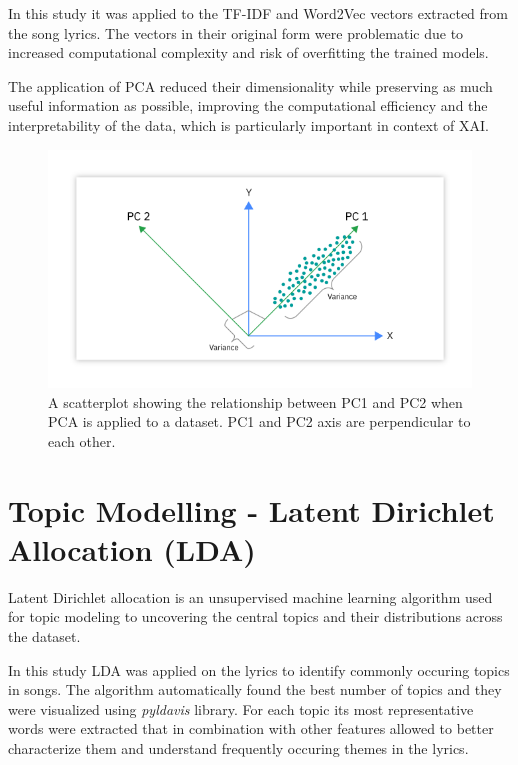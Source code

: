 In this study it was applied to the TF-IDF and Word2Vec vectors extracted from
the song lyrics. The vectors in their original form were problematic due  to
increased computational complexity and risk of overfitting the trained models.

The application of PCA reduced their dimensionality while preserving as much
useful information as possible, improving the computational efficiency and 
the interpretability of the data, which is particularly important in context of
XAI.

\begin{center}
\begin{figure}[H]
  \centering
  \includegraphics[width=6in]{img/pca.png}
  \caption{A scatterplot showing the relationship between PC1 and PC2 when PCA
  is applied to a dataset. PC1 and PC2 axis are perpendicular to each other. \cite{pca}}
  \label{Figure:pca}
\end{figure}
\end{center}


\section{Topic Modelling - Latent Dirichlet Allocation (LDA)}
\label{sec:topicmodelling}

Latent Dirichlet allocation is an unsupervised machine learning algorithm used
for topic modeling to uncovering the central topics and their distributions
across the dataset. \cite{lda}

In this study LDA was applied on the lyrics to identify commonly occuring
topics in songs. The algorithm automatically found the best number of topics
and they were visualized using \textit{pyldavis} \cite{pylda} library. For each
topic its most representative words were extracted that in combination with
other features allowed to better characterize them and understand frequently
occuring themes in the lyrics.



